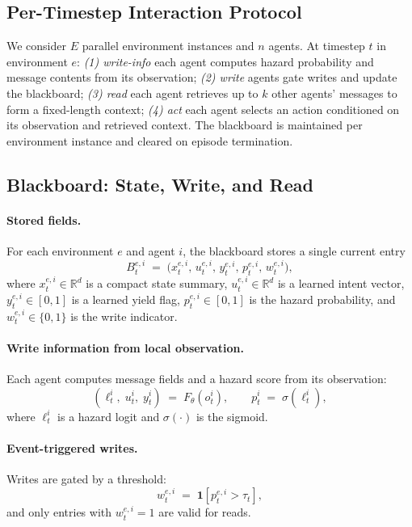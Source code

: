 \documentclass{article}
\theoremstyle{plain}
\theoremstyle{definition}
\theoremstyle{remark}
\begin{document}
\subsection{Per-Timestep Interaction Protocol}
\label{sec:protocol}
We consider $E$ parallel environment instances and $n$ agents. At timestep $t$ in environment $e$:
\emph{(1) write-info} each agent computes hazard probability and message contents from its observation;
\emph{(2) write} agents gate writes and update the blackboard;
\emph{(3) read} each agent retrieves up to $k$ other agents' messages to form a fixed-length context;
\emph{(4) act} each agent selects an action conditioned on its observation and retrieved context.
The blackboard is maintained per environment instance and cleared on episode termination.

\subsection{Blackboard: State, Write, and Read}
\label{sec:blackboard}

\paragraph{Stored fields.}
For each environment $e$ and agent $i$, the blackboard stores a single current entry
\begin{equation}
B_t^{e,i} \;=\; \big(x_t^{e,i},\, u_t^{e,i},\, y_t^{e,i},\, p_t^{e,i},\, w_t^{e,i}\big),
\label{eq:blackboard-entry}
\end{equation}
where $x_t^{e,i}\in\mathbb{R}^{d}$ is a compact state summary,
$u_t^{e,i}\in\mathbb{R}^{d}$ is a learned intent vector,
$y_t^{e,i}\in[0,1]$ is a learned yield flag,
$p_t^{e,i}\in[0,1]$ is the hazard probability,
and $w_t^{e,i}\in\{0,1\}$ is the write indicator.

\paragraph{Write information from local observation.}
Each agent computes message fields and a hazard score from its observation:
\begin{equation}
(\ell_t^i,\; u_t^i,\; y_t^i) \;=\; F_\theta(o_t^i),
\qquad
p_t^i \;=\; \sigma(\ell_t^i),
\label{eq:write-info}
\end{equation}
where $\ell_t^i$ is a hazard logit and $\sigma(\cdot)$ is the sigmoid.

\paragraph{Event-triggered writes.}
Writes are gated by a threshold:
\begin{equation}
w_t^{e,i} \;=\; \mathbf{1}\!\left[p_t^{e,i} > \tau_t\right],
\label{eq:gate}
\end{equation}
and only entries with $w_t^{e,i}=1$ are valid for reads.
\end{document}

